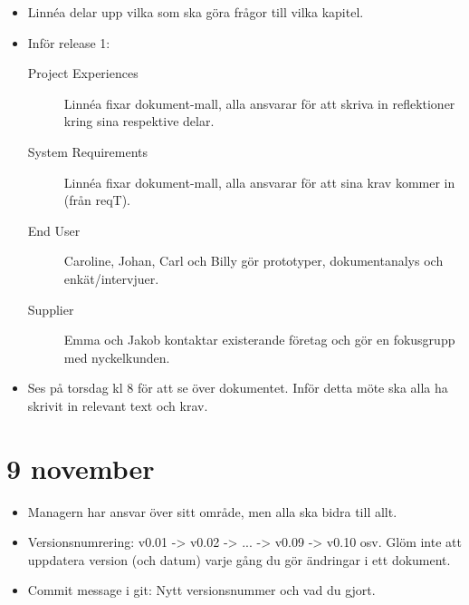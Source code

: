 \documentclass[10pt,a4paper]{article}
\begin{document}
\begin{itemize}
\item Linnéa delar upp vilka som ska göra frågor till vilka kapitel.
\item Inför release 1:
\begin{description}
\item[Project Experiences] Linnéa fixar dokument-mall, alla ansvarar för att skriva in reflektioner kring sina respektive delar.
\item[System Requirements] Linnéa fixar dokument-mall, alla ansvarar för att sina krav kommer in (från reqT).
\item[End User] Caroline, Johan, Carl och Billy gör prototyper, dokumentanalys och enkät/intervjuer.
\item[Supplier] Emma och Jakob kontaktar existerande företag och gör en fokusgrupp med nyckelkunden.
\end{description}
\item Ses på torsdag kl 8 för att se över dokumentet. Inför detta möte ska alla ha skrivit in relevant text och krav.
\end{itemize}

\section*{9 november}
\begin{itemize}
\item Managern har ansvar över sitt område, men alla ska bidra till allt.
\item Versionsnumrering: v0.01 -> v0.02 -> ... -> v0.09 -> v0.10 osv. Glöm inte att uppdatera version (och datum) varje gång du gör ändringar i ett dokument.
\item Commit message i git: Nytt versionsnummer och vad du gjort.
\end{itemize}
\end{document}

